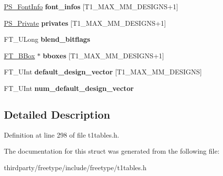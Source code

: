 \begin{DoxyCompactItemize}
\mbox{\label{struct_p_s___blend_rec___ac5478cafc838257e693a9604edf1f5e9}} 
\hyperlink{struct_p_s___font_info_rec__}{P\+S\+\_\+\+Font\+Info} {\bfseries font\+\_\+infos} \mbox{[}T1\+\_\+\+M\+A\+X\+\_\+\+M\+M\+\_\+\+D\+E\+S\+I\+G\+NS+1\mbox{]}
\item 
\mbox{\label{struct_p_s___blend_rec___a2b6e0c48d7a9c350b09f2943c1779ea4}} 
\hyperlink{struct_p_s___private_rec__}{P\+S\+\_\+\+Private} {\bfseries privates} \mbox{[}T1\+\_\+\+M\+A\+X\+\_\+\+M\+M\+\_\+\+D\+E\+S\+I\+G\+NS+1\mbox{]}
\item 
\mbox{\label{struct_p_s___blend_rec___a86caa5319e208b4a2057db656bad9221}} 
F\+T\+\_\+\+U\+Long {\bfseries blend\+\_\+bitflags}
\item 
\mbox{\label{struct_p_s___blend_rec___a30845d3cbd2e95a5f9cc867c7226af5e}} 
\hyperlink{struct_f_t___b_box__}{F\+T\+\_\+\+B\+Box} $\ast$ {\bfseries bboxes} \mbox{[}T1\+\_\+\+M\+A\+X\+\_\+\+M\+M\+\_\+\+D\+E\+S\+I\+G\+NS+1\mbox{]}
\item 
\mbox{\label{struct_p_s___blend_rec___a3ddacbda91fe0f9ef934a9e0afa6286f}} 
F\+T\+\_\+\+U\+Int {\bfseries default\+\_\+design\+\_\+vector} \mbox{[}T1\+\_\+\+M\+A\+X\+\_\+\+M\+M\+\_\+\+D\+E\+S\+I\+G\+NS\mbox{]}
\item 
\mbox{\label{struct_p_s___blend_rec___afa5c7dd4206eb8a1d9ef4894abfc9555}} 
F\+T\+\_\+\+U\+Int {\bfseries num\+\_\+default\+\_\+design\+\_\+vector}
\end{DoxyCompactItemize}


\subsection{Detailed Description}


Definition at line 298 of file t1tables.\+h.



The documentation for this struct was generated from the following file\+:\begin{DoxyCompactItemize}
\item 
thirdparty/freetype/include/freetype/t1tables.\+h\end{DoxyCompactItemize}
